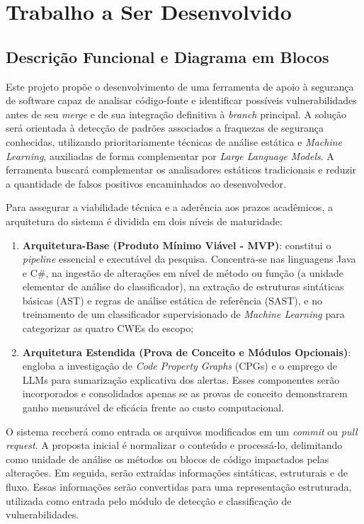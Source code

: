 \chapter{Trabalho a Ser Desenvolvido}
\label{cap:trabalho}

\section{Descrição Funcional e Diagrama em Blocos}

Este projeto propõe o desenvolvimento de uma ferramenta de apoio à
segurança de software capaz de analisar código-fonte e identificar
possíveis vulnerabilidades antes de seu \textit{merge} e de sua integração definitiva à \textit{branch} principal. A solução
será orientada à detecção de padrões associados a fraquezas de segurança
conhecidas, utilizando prioritariamente técnicas de análise estática e \textit{Machine
Learning}, auxiliadas de forma complementar por \textit{Large Language Models}. A
ferramenta buscará complementar os analisadores estáticos tradicionais e
reduzir a quantidade de falsos positivos encaminhados ao desenvolvedor.

Para assegurar a viabilidade técnica e a aderência aos prazos acadêmicos, a arquitetura do sistema é dividida em dois níveis de maturidade:
\begin{enumerate}
    \item \textbf{Arquitetura-Base (Produto Mínimo Viável - MVP)}: constitui o \textit{pipeline} essencial e executável da pesquisa. Concentra-se nas linguagens Java e C\#, na ingestão de alterações em nível de método ou função (a unidade elementar de análise do classificador), na extração de estruturas sintáticas básicas (AST) e regras de análise estática de referência (SAST), e no treinamento de um classificador supervisionado de \textit{Machine Learning} para categorizar as quatro CWEs do escopo;
    \item \textbf{Arquitetura Estendida (Prova de Conceito e Módulos Opcionais)}: engloba a investigação de \textit{Code Property Graphs} (CPGs) e o emprego de LLMs para sumarização explicativa dos alertas. Esses componentes serão incorporados e consolidados apenas se as provas de conceito demonstrarem ganho mensurável de eficácia frente ao custo computacional.
\end{enumerate}

O sistema receberá como entrada os arquivos modificados em um \textit{commit}
ou \textit{pull request}. A proposta inicial é normalizar o conteúdo e processá-lo, delimitando como unidade de análise os métodos ou blocos de código impactados pelas alterações.
Em seguida, serão extraídas informações sintáticas, estruturais e de fluxo. Essas informações serão convertidas para uma representação estruturada, utilizada como entrada pelo módulo de detecção e classificação de vulnerabilidades.

